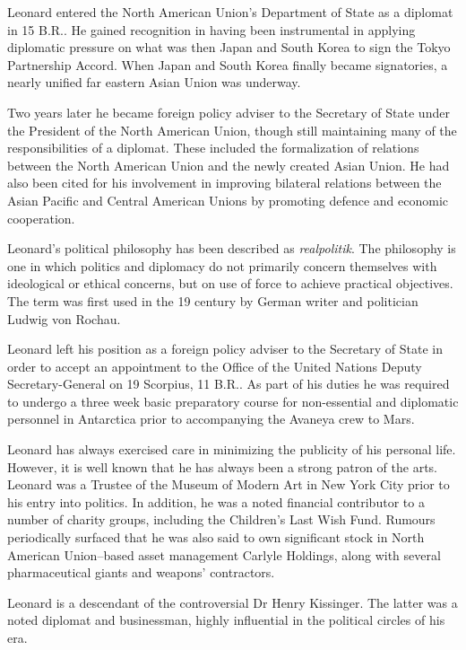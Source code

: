 Leonard entered the North American Union's Department of State as a diplomat in 15 B.R.. He gained recognition in having been instrumental in applying diplomatic pressure on what was then Japan and South Korea to sign the Tokyo Partnership Accord. When Japan and South Korea finally became signatories, a nearly unified far eastern Asian Union was underway.

Two years later he became foreign policy adviser to the Secretary of State under the President of the North American Union, though still maintaining many of the responsibilities of a diplomat. These included the formalization of relations between the North American Union and the newly created Asian Union. He had also been cited for his involvement in improving bilateral relations between the Asian Pacific and Central American Unions by promoting defence and economic cooperation.

Leonard's political philosophy has been described as {\it realpolitik}. The philosophy is one in which politics and diplomacy do not primarily concern themselves with ideological or ethical concerns, but on use of force to achieve practical objectives. The term was first used in the 19 century by German writer and politician Ludwig von Rochau.

Leonard left his position as a foreign policy adviser to the Secretary of State in order to accept an appointment to the Office of the United Nations Deputy Secretary-General on 19 Scorpius, 11 B.R.. As part of his duties he was required to undergo a three week basic preparatory course for non-essential and diplomatic personnel in Antarctica prior to accompanying the Avaneya crew to Mars.

Leonard has always exercised care in minimizing the publicity of his personal life. However, it is well known that he has always been a strong patron of the arts. Leonard was a Trustee of the Museum of Modern Art in New York City prior to his entry into politics. In addition, he was a noted financial contributor to a number of charity groups, including the Children's Last Wish Fund. Rumours periodically surfaced that he was also said to own significant stock in North American Union--based asset management Carlyle Holdings, along with several pharmaceutical giants and weapons' contractors.

Leonard is a descendant of the controversial Dr Henry Kissinger. The latter was a noted diplomat and businessman, highly influential in the political circles of his era.

